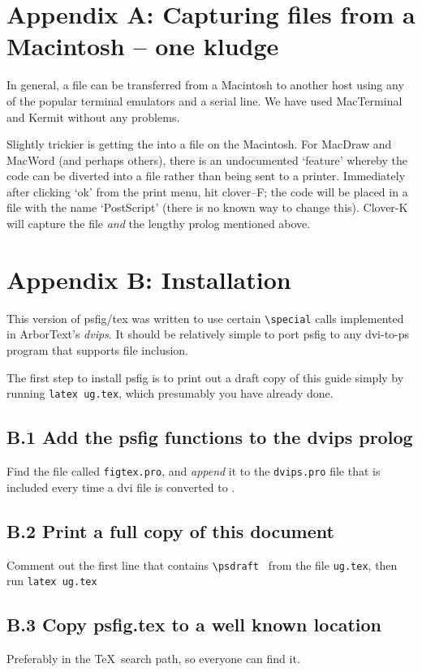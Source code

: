 \section*{Appendix A: Capturing \Ps files from a Macintosh -- one kludge}
In general, a \Ps file can be transferred from a Macintosh to another host
using any of the popular terminal emulators and a serial line. We have used
MacTerminal and Kermit without any problems.
\par
Slightly trickier is getting the \Ps into a file on the Macintosh. For
MacDraw and MacWord (and perhaps others), there is an undocumented
`feature' whereby the \Ps code can be diverted into a file rather than
being sent to a printer. Immediately after clicking `ok' from the print
menu, hit clover--F; the code will be placed in a file with the name 
`PostScript' (there is no known way to change this). Clover-K will 
capture the file {\it and} the lengthy prolog mentioned above.
\newpage
\section*{Appendix B: Installation}
\par
This version of psfig/tex was written to use certain {\tt \verb+\+special}
calls implemented in ArborText's {\it dvips}. It should be relatively
simple to port psfig to any dvi-to-ps program that supports file inclusion.
\par
The first step to install psfig is to print out a draft copy of this
guide simply by running {\tt latex ug.tex},
which presumably you have already done. 
\subsection*{B.1 Add the psfig \Ps functions to the dvips prolog}
Find the file called {\tt figtex.pro}, and {\it append} 
it to the {\tt dvips.pro}
file that is included every time a dvi file is converted to \Ps.
\subsection*{B.2 Print a full copy of this document}
Comment out the first line that contains {\tt \verb+\+psdraft } from the file
{\tt ug.tex}, then run {\tt latex ug.tex}
\subsection*{B.3 Copy psfig.tex to a well known location}
Preferably in the \TeX\ search path, so everyone can find it.


